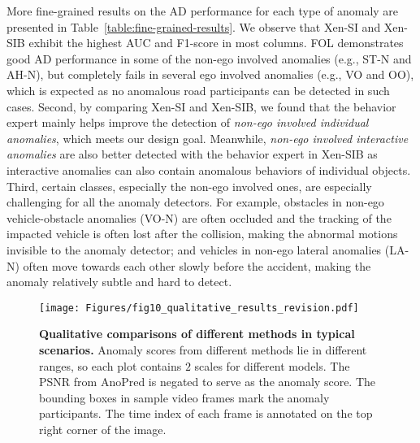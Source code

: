 More fine-grained results on the AD performance for each type of anomaly are presented in Table~\ref{table:fine-grained-results}. We observe that Xen-SI and Xen-SIB exhibit the highest AUC and F1-score in most columns. FOL demonstrates good AD performance in some of the non-ego involved anomalies (e.g., ST-N and AH-N), but completely fails in several ego involved anomalies (e.g., VO and OO), which is expected as no anomalous road participants can be detected in such cases. Second, by comparing Xen-SI and Xen-SIB, we found that the behavior expert mainly helps improve the detection of \textit{non-ego involved individual anomalies}, which meets our design goal. Meanwhile, \textit{non-ego involved interactive anomalies} are also better detected with the behavior expert in Xen-SIB as interactive anomalies can also contain anomalous behaviors of individual objects. Third, certain classes, especially the non-ego involved ones, are especially challenging for all the anomaly detectors. For example, obstacles in non-ego vehicle-obstacle anomalies (VO-N) are often occluded and the tracking of the impacted vehicle is often lost after the collision, making the abnormal motions invisible to the anomaly detector; and vehicles in non-ego lateral anomalies (LA-N) often move towards each other slowly before the accident, making the anomaly relatively subtle and hard to detect.

\begin{figure*}
  \centering
  \texttt{[image: Figures/fig10\_qualitative\_results\_revision.pdf]}
  \caption{\textbf{Qualitative comparisons of different methods in typical scenarios.} Anomaly scores from different methods lie in different ranges, so each plot contains $2$ scales for different models. The PSNR from AnoPred is negated to serve as the anomaly score. The bounding boxes in sample video frames mark the anomaly participants. The time index of each frame is annotated on the top right corner of the image.}
  \label{fig:qualitative-results}
\end{figure*}

